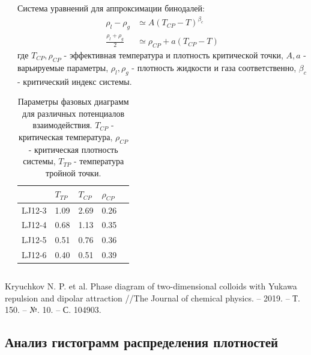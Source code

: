 \documentclass[pdf,hyperref={unicode}]{beamer}
\begin{document}
\begin{frame}
\begin{columns}
\begin{column}{0.55\linewidth}
\end{column}

\begin{column}{0.5\linewidth}
\tiny{
Система уравнений для аппроксимации бинодалей:
\begin{equation}
\begin{aligned}
\rho_l - \rho_g &\simeq A (T_{CP} - T)^{\beta_c} \\
\frac{\rho_l + \rho_g}{2} &\simeq \rho_{CP} + a(T_{CP} - T)
\end{aligned}
\label{eqFitFhase}
\end{equation}
где $T_{CP}, \rho_{CP}$ - эффективная температура и плотность критической точки, $A, a$ - варьируемые параметры, $\rho_l, \rho_g$ - плотность жидкости и газа соответственно, $\beta_c$ - критический индекс системы.
}

\tiny{
\begin{table}[h]
\begin{tabular}{| l | l | l | l | l |}
\hline
    & $T_{TP}$  & $T_{CP}$  & $\rho_{CP}$   \\ \hline
LJ12-3  & 1.09  &  2.69   &  0.26   \\ \hline
LJ12-4  & 0.68  & 1.13    & 0.35    \\ \hline
LJ12-5  & 0.51  &  0.76   &  0.36   \\ \hline
LJ12-6  & 0.40  &  0.51   &  0.39   \\ \hline
\end{tabular}
\caption{\tiny Параметры фазовых диаграмм для различных потенциалов взаимодействия. $T_{CP}$ - критическая температура, $\rho_{CP}$ - критическая плотность системы, $T_{TP}$ - температура тройной точки.}
\label{tablSystemConst}
\end{table}
}

\end{column}

\end{columns}
\vspace{7mm}
\tiny{
Kryuchkov N. P. et al. Phase diagram of two-dimensional colloids with Yukawa repulsion and dipolar attraction //The Journal of chemical physics. – 2019. – Т. 150. – №. 10. – С. 104903.
}
\end{frame}




\subsection{Анализ гистограмм распределения плотностей}
\end{document}
